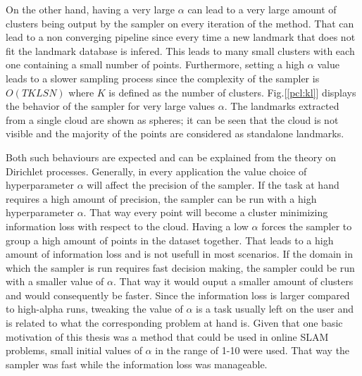 \documentclass[twoside,hidelinks]{article}
\begin{document}
On the other hand, having a very large $\alpha$ can lead to a very large amount of clusters being output by the sampler on every iteration of the method. That can lead to a non converging pipeline since every time a new landmark that does not fit the landmark database is infered. This leads to many small clusters with each one containing a small number of points. Furthermore, setting a high $\alpha$ value leads to a slower sampling process since the complexity of the sampler is $O(TKLSN)$ where $K$ is defined as the number of clusters. Fig.[\ref{pcl:kl}] displays the behavior of the sampler for very large values $\alpha$. The landmarks extracted from a single cloud are shown as spheres; it can be seen that the cloud is not visible and the majority of the points are considered as standalone landmarks.

Both such behaviours are expected and can be explained from the theory on Dirichlet processes\cite{dependent}. Generally, in every application the value choice of hyperparameter $\alpha$ will affect the precision of the sampler. If the task at hand requires a high amount of precision, the sampler can be run with a high hyperparameter $\alpha$. That way every point will become a cluster minimizing information loss with respect to the cloud. Having a low $\alpha$ forces the sampler to group a high amount of points in the dataset together. That leads to a high amount of information loss and is not usefull in most scenarios. If the domain in which the sampler is run requires fast decision making, the sampler could be run with a smaller value of $\alpha$. That way it would ouput a smaller amount of clusters and would consequently be faster. Since the information loss is larger compared to high-alpha runs, tweaking the value of $\alpha$ is a task usually left on the user and is related to  what the corresponding problem at hand is. Given that one basic motivation of this thesis was a method that could be used in online SLAM problems, small initial values of $\alpha$ in the range of 1-10 were used. That way the sampler was fast while the information loss was manageable.
\end{document}
